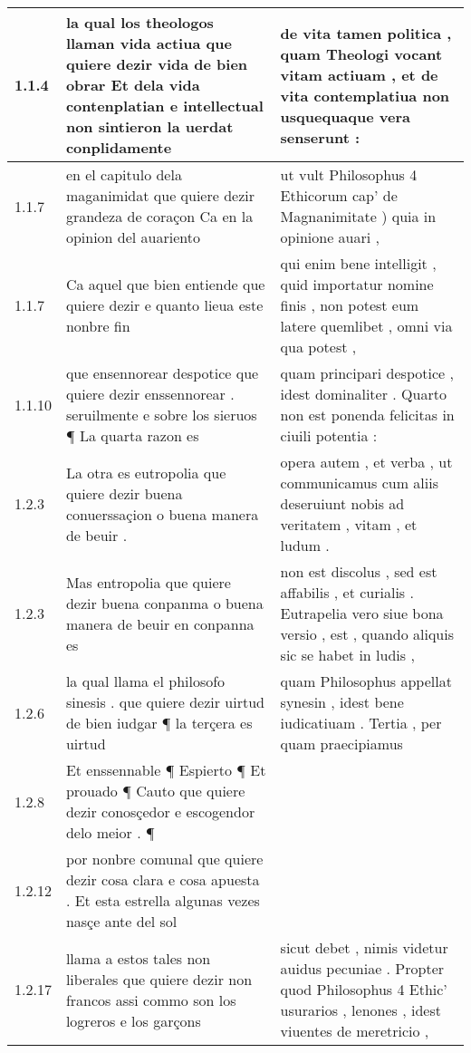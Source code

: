\begin{tabular}{|p{1cm}|p{6.5cm}|p{6.5cm}|}

\hline
1.1.4 & la qual los theologos llaman vida actiua que quiere dezir vida de bien obrar Et dela vida contenplatian e intellectual non sintieron la uerdat conplidamente & de vita tamen politica , quam Theologi vocant vitam actiuam , et de vita contemplatiua non usquequaque vera senserunt : \\\hline
1.1.7 & en el capitulo dela maganimidat que quiere dezir grandeza de coraçon Ca en la opinion del auariento & ut vult Philosophus 4 Ethicorum cap’ de Magnanimitate ) quia in opinione auari , \\\hline
1.1.7 & Ca aquel que bien entiende que quiere dezir e quanto lieua este nonbre fin & qui enim bene intelligit , quid importatur nomine finis , non potest eum latere quemlibet , omni via qua potest , \\\hline
1.1.10 & que ensennorear despotice que quiere dezir enssennorear . seruilmente e sobre los sieruos ¶ La quarta razon es & quam principari despotice , idest dominaliter . Quarto non est ponenda felicitas in ciuili potentia : \\\hline
1.2.3 & La otra es eutropolia que quiere dezir buena conuerssaçion o buena manera de beuir . & opera autem , et verba , ut communicamus cum aliis deseruiunt nobis ad veritatem , vitam , et ludum . \\\hline
1.2.3 & Mas entropolia que quiere dezir buena conpanma o buena manera de beuir en conpanna es & non est discolus , sed est affabilis , et curialis . Eutrapelia vero siue bona versio , est , quando aliquis sic se habet in ludis , \\\hline
1.2.6 & la qual llama el philosofo sinesis . que quiere dezir uirtud de bien iudgar ¶ la terçera es uirtud & quam Philosophus appellat synesin , idest bene iudicatiuam . Tertia , per quam praecipiamus \\\hline
1.2.8 & Et enssennable ¶ Espierto ¶ Et prouado ¶ Cauto que quiere dezir conosçedor e escogendor delo meior . ¶ &  \\\hline
1.2.12 & por nonbre comunal que quiere dezir cosa clara e cosa apuesta . Et esta estrella algunas vezes nasçe ante del sol &  \\\hline
1.2.17 & llama a estos tales non liberales que quiere dezir non francos assi commo son los logreros e los garçons & sicut debet , nimis videtur auidus pecuniae . Propter quod Philosophus 4 Ethic’ usurarios , lenones , idest viuentes de meretricio , \\\hline

\end{tabular}
